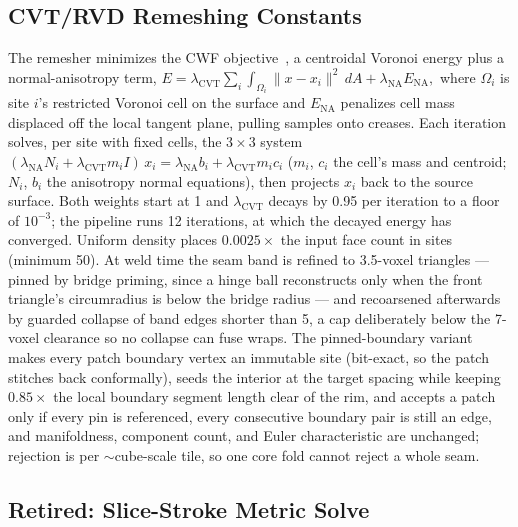 \subsection{CVT/RVD Remeshing Constants}
\label{app:cvt}

The remesher minimizes the CWF objective~\cite{xu2024cwf}, a centroidal Voronoi energy plus a normal-anisotropy term,
$E = \lambda_{\mathrm{CVT}} \sum_i \int_{\Omega_i} \lVert x - x_i\rVert^2 \, dA + \lambda_{\mathrm{NA}} E_{\mathrm{NA}},$
where $\Omega_i$ is site $i$'s restricted Voronoi cell on the surface and $E_{\mathrm{NA}}$ penalizes cell mass displaced off the local tangent plane, pulling samples onto creases. Each iteration solves, per site with fixed cells, the $3\times3$ system $(\lambda_{\mathrm{NA}} N_i + \lambda_{\mathrm{CVT}} m_i I)\,x_i = \lambda_{\mathrm{NA}} b_i + \lambda_{\mathrm{CVT}} m_i c_i$ ($m_i$, $c_i$ the cell's mass and centroid; $N_i$, $b_i$ the anisotropy normal equations), then projects $x_i$ back to the source surface. Both weights start at 1 and $\lambda_{\mathrm{CVT}}$ decays by 0.95 per iteration to a floor of $10^{-3}$; the pipeline runs 12 iterations, at which the decayed energy has converged. Uniform density places $0.0025\times$ the input face count in sites (minimum 50). At weld time the seam band is refined to 3.5-voxel triangles --- pinned by bridge priming, since a hinge ball reconstructs only when the front triangle's circumradius is below the bridge radius --- and recoarsened afterwards by guarded collapse of band edges shorter than 5, a cap deliberately below the 7-voxel clearance so no collapse can fuse wraps. The pinned-boundary variant makes every patch boundary vertex an immutable site (bit-exact, so the patch stitches back conformally), seeds the interior at the target spacing while keeping $0.85\times$ the local boundary segment length clear of the rim, and accepts a patch only if every pin is referenced, every consecutive boundary pair is still an edge, and manifoldness, component count, and Euler characteristic are unchanged; rejection is per $\sim$cube-scale tile, so one core fold cannot reject a whole seam.

\subsection{Retired: Slice-Stroke Metric Solve}
\label{app:slice}

